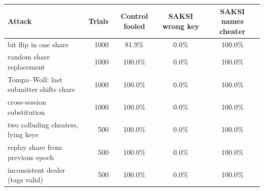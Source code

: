 \begin{tabular}{@{}>{\raggedright\arraybackslash}p{5.0cm}rccc@{}}
\toprule
Attack & Trials & Control fooled & SAKSI wrong key & SAKSI names cheater \\
\midrule
bit flip in one share & 1000 & 81.9\% & 0.0\% & 100.0\% \\
random share replacement & 1000 & 100.0\% & 0.0\% & 100.0\% \\
Tompa--Woll: last submitter shifts share & 1000 & 100.0\% & 0.0\% & 100.0\% \\
cross-session substitution & 1000 & 100.0\% & 0.0\% & 100.0\% \\
two colluding cheaters, lying keys & 500 & 100.0\% & 0.0\% & 100.0\% \\
replay share from previous epoch & 500 & 100.0\% & 0.0\% & 100.0\% \\
inconsistent dealer (tags valid) & 500 & 100.0\% & 0.0\% & 100.0\% \\
\bottomrule
\end{tabular}
